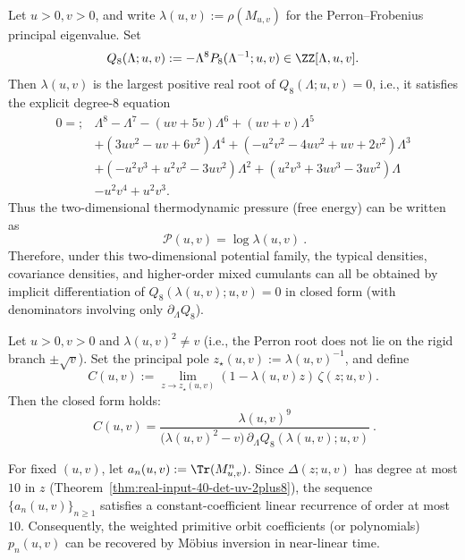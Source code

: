 \begin{proposition}\label{prop:real-input-40-zeta-uv-pressure-degree8}
Let $u>0,v>0$, and write $\lambda(u,v):=\rho(M_{u,v})$ for the Perron--Frobenius principal eigenvalue.
Set
\[
Q_8(\Lambda;u,v):=-\Lambda^8 P_8(\Lambda^{-1};u,v)\in\ZZ[\Lambda,u,v].
\]
Then $\lambda(u,v)$ is the largest positive real root of $Q_8(\Lambda;u,v)=0$, i.e., it satisfies the explicit degree-$8$ equation
\[
\boxed{
\begin{aligned}
0=;&\Lambda^8-\Lambda^7-(uv+5v)\Lambda^6+(uv+v)\Lambda^5\\
&+(3uv^2-uv+6v^2)\Lambda^4+(-u^2v^2-4uv^2+uv+2v^2)\Lambda^3\\
&+(-u^2v^3+u^2v^2-3uv^2)\Lambda^2+(u^2v^3+3uv^3-3uv^2)\Lambda\\
&-u^2v^4+u^2v^3.
\end{aligned}}
\]
Thus the two-dimensional thermodynamic pressure (free energy) can be written as
\[
\boxed{\ \mathcal P(u,v)=\log\lambda(u,v)\ }.
\]
Therefore, under this two-dimensional potential family, the typical densities, covariance densities, and higher-order mixed cumulants can all be obtained by implicit differentiation of $Q_8(\lambda(u,v);u,v)=0$ in closed form (with denominators involving only $\partial_\Lambda Q_8$).
\end{proposition}

\begin{proposition}\label{prop:real-input-40-zeta-uv-residue}
Let $u>0,v>0$ and $\lambda(u,v)^2\neq v$ (i.e., the Perron root does not lie on the rigid branch $\pm\sqrt v$).
Set the principal pole $z_\star(u,v):=\lambda(u,v)^{-1}$, and define
\[
C(u,v):=\lim_{z\to z_\star(u,v)}(1-\lambda(u,v)z)\,\zeta(z;u,v).
\]
Then the closed form holds:
\[
\boxed{\ C(u,v)=\frac{\lambda(u,v)^9}{\bigl(\lambda(u,v)^2-v\bigr)\,\partial_\Lambda Q_8(\lambda(u,v);u,v)}\ }.
\]
\end{proposition}

\begin{proposition}\label{prop:real-input-40-zeta-uv-recurrence}
For fixed $(u,v)$, let
\(
a_n(u,v):=\Tr(M_{u,v}^n)
\).
Since $\Delta(z;u,v)$ has degree at most $10$ in $z$ (Theorem~\ref{thm:real-input-40-det-uv-2plus8}), the sequence $\{a_n(u,v)\}_{n\ge 1}$ satisfies a constant-coefficient linear recurrence of order at most $10$.
Consequently, the weighted primitive orbit coefficients (or polynomials)
\(
p_n(u,v)
\)
can be recovered by M\"obius inversion in near-linear time.
\end{proposition}


